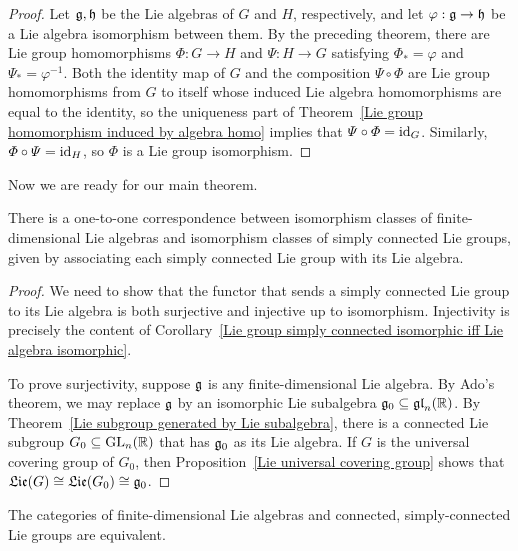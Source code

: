 \begin{proof}
Let $\mathfrak{g},\mathfrak{h}$ be the Lie algebras of $G$ and $H$, respectively, and let $\varphi:\mathfrak{g}\to\mathfrak{h}$ be a Lie algebra isomorphism between them. By the preceding theorem, there are Lie group homomorphisms $\varPhi:G\to H$ and $\varPsi:H\to G$ satisfying $\varPhi_*=\varphi$ and $\varPsi_*=\varphi^{-1}$. Both the identity map of $G$ and the composition $\varPsi\circ\varPhi$ are Lie group homomorphisms from $G$ to itself whose induced Lie algebra homomorphisms are equal to the identity, so the uniqueness part of Theorem~\ref{Lie group homomorphism induced by algebra homo} implies that $\varPsi\circ\varPhi=\mathrm{id}_G$. Similarly, $\varPhi\circ\varPsi=\mathrm{id}_H$, so $\varPhi$ is a Lie group isomorphism.
\end{proof}
Now we are ready for our main theorem.
\begin{theorem}\label{Lie correspondence}
There is a one-to-one correspondence between isomorphism classes of finite-dimensional Lie algebras and isomorphism classes of simply connected Lie groups, given by associating each simply connected Lie group with its Lie algebra.
\end{theorem}
\begin{proof}
We need to show that the functor that sends a simply connected Lie group to its Lie algebra is both surjective and injective up to isomorphism. Injectivity is precisely the content of Corollary~\ref{Lie group simply connected isomorphic iff Lie algebra isomorphic}.\par
To prove surjectivity, suppose $\mathfrak{g}$ is any finite-dimensional Lie algebra. By Ado's theorem, we may replace $\mathfrak{g}$ by an isomorphic Lie subalgebra $\mathfrak{g}_0\subseteq\mathfrak{gl}_n(\mathbb{R})$. By Theorem~\ref{Lie subgroup generated by Lie subalgebra}, there is a connected Lie subgroup $G_0\subseteq\mathrm{GL}_n(\mathbb{R})$ that has $\mathfrak{g}_0$ as its Lie algebra. If $G$ is the universal covering group of $G_0$, then Proposition~\ref{Lie universal covering group} shows that $\mathfrak{Lie}(G)\cong\mathfrak{Lie}(G_0)\cong\mathfrak{g}_0$.
\end{proof}
\begin{corollary}
The categories of finite-dimensional Lie algebras and connected, simply-connected Lie groups are equivalent.
\end{corollary}
